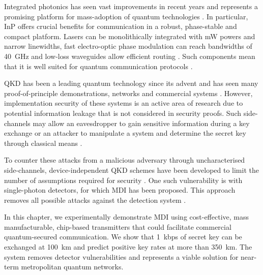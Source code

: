Integrated photonics has seen vast improvements in recent years and represents a promising platform for mass-adoption of quantum technologies \cite{thompson2011}. In particular, \ac{InP} offers crucial benefits for communication in a robust, phase-stable and compact platform. Lasers can be monolithically integrated with mW powers and narrow linewidths, fast electro-optic phase modulation can reach bandwidths of \SI{40}{GHz} and low-loss waveguides allow efficient routing \cite{smit2014}. Such components mean that it is well suited for quantum communication protocols \cite{Sibson2017InP}. 

\Acl{QKD} has been a leading quantum technology since its advent \cite{BB84, E91} and has seen many proof-of-principle demonstrations, networks and commercial systems \cite{yin2016, Rubenok2013, Comandar2016, zhang2018, commercial}. However, implementation security of these systems is an active area of research due to potential information leakage that is not considered in security proofs. Such side-channels may allow an eavesdropper to gain sensitive information during a key exchange \cite{Lo2014} or an attacker to manipulate a system and determine the secret key through classical means \cite{Lydersen2010b}. 

To counter these attacks from a malicious adversary through uncharacterised side-channels, device-independent \ac{QKD} schemes have been developed to limit the number of assumptions required for security \cite{Masanes2011}. One such vulnerability is with single-photon detectors, for which \ac{MDI} has been proposed. This approach removes all possible attacks against the detection system \cite{mdi-qkd}.

In this chapter, we experimentally demonstrate \ac{MDI} using cost-effective, mass manufacturable, chip-based transmitters that could facilitate commercial quantum-secured communication. We show that \SI{1}{kbps} of secret key can be exchanged at  \SI{100}{km} and predict positive key rates at more than \SI{350}{km}. The system removes detector vulnerabilities and represents a viable solution for near-term metropolitan quantum networks.



